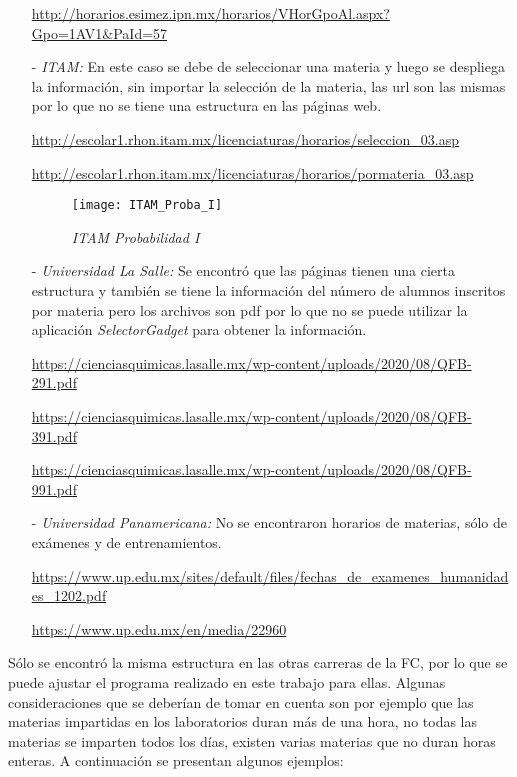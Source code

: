 \begin{itemize}
\url{http://horarios.esimez.ipn.mx/horarios/VHorGpoAl.aspx?Gpo=1AV1&PaId=57}




\item[-] \textit{ITAM:} En este caso se debe de seleccionar una materia y luego se despliega la información, sin importar la selección de la materia, las url son las mismas por lo que no se tiene una estructura en las páginas web.

\url{http://escolar1.rhon.itam.mx/licenciaturas/horarios/seleccion_03.asp}

\url{http://escolar1.rhon.itam.mx/licenciaturas/horarios/pormateria_03.asp}

\begin{figure}[H]
\centering
\texttt{[image: ITAM\_Proba\_I]} %
\caption{\textit{ITAM Probabilidad I}}
\end{figure}


\item[-] \textit{Universidad La Salle:} Se encontró que las páginas tienen una cierta estructura y también se tiene la información del número de alumnos inscritos por materia pero los archivos son pdf por lo que no se puede utilizar la aplicación \textit{SelectorGadget} para obtener la información.

\url{https://cienciasquimicas.lasalle.mx/wp-content/uploads/2020/08/QFB-291.pdf}

\url{https://cienciasquimicas.lasalle.mx/wp-content/uploads/2020/08/QFB-391.pdf}

\url{https://cienciasquimicas.lasalle.mx/wp-content/uploads/2020/08/QFB-991.pdf}


\item[-] \textit{Universidad Panamericana:} No se encontraron horarios de materias, sólo de exámenes y de entrenamientos.

\url{https://www.up.edu.mx/sites/default/files/fechas_de_examenes_humanidades_1202.pdf}

\url{https://www.up.edu.mx/en/media/22960}

\end{itemize}

Sólo se encontró la misma estructura en las otras carreras de la FC, por lo que se puede ajustar el programa realizado en este trabajo para ellas. Algunas consideraciones que se deberían de tomar en cuenta son por ejemplo que las materias impartidas en los laboratorios duran más de una hora, no todas las materias se imparten todos los días, existen varias materias que no duran horas enteras. A continuación se presentan algunos ejemplos:

